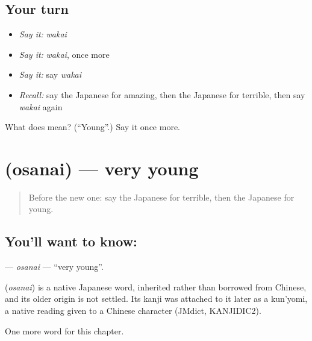 \subsection*{Your turn}
\begin{itemize}
\raggedright
  \item \emph{Say it:} \emph{wakai}
  \item \emph{Say it:} \emph{wakai}, once more
  \item \emph{Say it:} say \emph{wakai}
  \item \emph{Recall:} say the Japanese for amazing, then the Japanese for terrible, then say \emph{wakai} again
\end{itemize}

\begin{tcolorbox}[breakable,colback=teal!4,colframe=teal!35!black,title={Before you move on}]
What does  mean? (\textquotedblleft{}Young\textquotedblright{}.) Say it once more.
\end{tcolorbox}
\section[\texorpdfstring{\ja{おさない} (osanai)}{おさない (osanai)}]{ (osanai) — very young}

\label{lesson:JA-C125-osanai}



\begin{quote}
Before the new one: say the Japanese for terrible, then the Japanese for young.
\end{quote}

\subsection*{You'll want to know: }
\textbf{} — \emph{osanai} — \textquotedblleft{}very young\textquotedblright{}.

\begin{cousinweb}
\textbf{} (\emph{osanai}) is a native Japanese word, inherited rather than borrowed from Chinese, and its older origin is not settled. Its kanji was attached to it later as a kun'yomi, a native reading given to a Chinese character (JMdict, KANJIDIC2).
\end{cousinweb}

\begin{grammarlens}[title={What you've built}]
One more word for this chapter.
\end{grammarlens}

